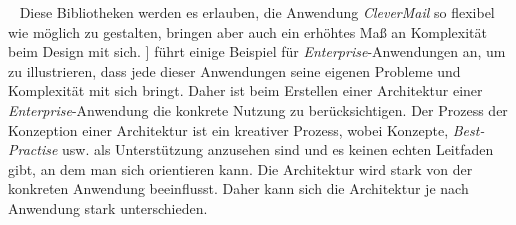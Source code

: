 \ \newline
Diese Bibliotheken werden es erlauben, die Anwendung \emph{CleverMail} so flexibel wie möglich zu gestalten, bringen aber auch ein erhöhtes Maß an Komplexität beim Design mit sich. 
\newline
\newline
[\cite[5-6]{patternsOfEnterprise}] führt einige Beispiel für \emph{Enterprise}-Anwendungen an, um zu illustrieren, dass jede dieser Anwendungen seine eigenen Probleme und Komplexität mit sich bringt. Daher ist beim Erstellen einer Architektur einer \emph{Enterprise}-Anwendung die konkrete Nutzung zu berücksichtigen. Der Prozess der Konzeption einer Architektur ist ein kreativer Prozess, wobei Konzepte, \emph{Best-Practise} usw. als Unterstützung anzusehen sind und es keinen echten Leitfaden gibt, an dem man sich orientieren kann. Die Architektur wird stark von der konkreten Anwendung beeinflusst. Daher kann sich die Architektur je nach Anwendung stark unterschieden.

